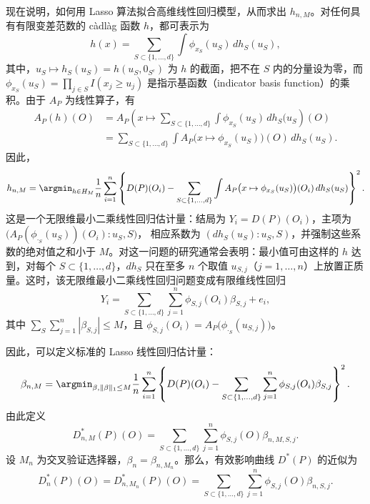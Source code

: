 现在说明，如何用 Lasso 算法拟合高维线性回归模型，从而求出 $h_{n,M}$。对任何具有有限变差范数的 càdlàg 函数 $h$，都可表示为
\[
 h(x)=\sum_{S\subset\{1,\ldots,d\}}\int\phi_{x_S}(u_S)\,dh_S(u_S),
\]
其中，$u_S\mapsto h_S(u_S)=h(u_S,0_{S^c})$ 为 $h$ 的截面，把不在 $S$ 内的分量设为零，而
$\phi_{x_S}(u_S)=\prod_{j\in S}I(x_j\geq u_j)$
是指示基函数（indicator basis function）的乘积。由于 $A_P$ 为线性算子，有
\[
 \begin{aligned}
 A_P(h)(O)
 &=A_P\left(x\mapsto
 \sum_{S\subset\{1,\ldots,d\}}\int\phi_{x_S}(u_S)\,dh_S(u_S
 \right)(O)\\
 &=\sum_{S\subset\{1,\ldots,d\}}\int
 A_P\bigl(x\mapsto\phi_{x_S}(u_S)\bigr)(O)\,dh_S(u_S).
 \end{aligned}
\]
因此，
\[
 h_{n,M}=\argmin_{h\in H_M}\frac1n\sum_{i=1}^n
 \left\{D(P)(O_i)-\sum_{S\subset\{1,\ldots,d\}}\int
 A_P\bigl(x\mapsto\phi_{x_S}(u_S)\bigr)(O_i)\,dh_S(u_S)\right\}^2.
\]
这是一个无限维最小二乘线性回归估计量：结局为 $Y_i=D(P)(O_i)$，主项为
$\bigl(A_P(\phi_{\cdot_S}(u_S))(O_i):u_S,S\bigr)$，
相应系数为 $(dh_S(u_S):u_S,S)$，并强制这些系数的绝对值之和小于 $M$。对这一问题的研究通常会表明：最小值可由这样的 $h$ 达到，对每个 $S\subset\{1,\ldots,d\}$，$dh_S$ 只在至多 $n$ 个取值 $u_{S,j}$（$j=1,\ldots,n$）上放置正质量。这时，该无限维最小二乘线性回归问题变成有限维线性回归
\[
 Y_i=\sum_{S\subset\{1,\ldots,d\}}\sum_{j=1}^n
 \phi_{S,j}(O_i)\beta_{S,j}+e_i,
\]
其中 $\sum_S\sum_{j=1}^n|\beta_{S,j}|\leq M$，且
$\phi_{S,j}(O_i)=A_P\bigl(\phi_{\cdot_S}(u_{S,j})\bigr)$。

因此，可以定义标准的 Lasso 线性回归估计量：
\[
 \beta_{n,M}=\argmin_{\beta,\|\beta\|_1\leq M}
 \frac1n\sum_{i=1}^n
 \left\{D(P)(O_i)-\sum_{S\subset\{1,\ldots,d\}}\sum_{j=1}^n
 \phi_{S,j}(O_i)\beta_{S,j}\right\}^2.
\]
由此定义
\[
 D_{n,M}^*(P)(O)=\sum_{S\subset\{1,\ldots,d\}}\sum_{j=1}^n
 \phi_{S,j}(O)\beta_{n,M,S,j}.
\]
设 $M_n$ 为交叉验证选择器，$\beta_n=\beta_{n,M_n}$。那么，有效影响曲线 $D^*(P)$ 的近似为
\[
 D_n^*(P)(O)=D_{n,M_n}^*(P)(O)
 =\sum_{S\subset\{1,\ldots,d\}}\sum_{j=1}^n
 \phi_{S,j}(O)\beta_{n,S,j}.
\]
